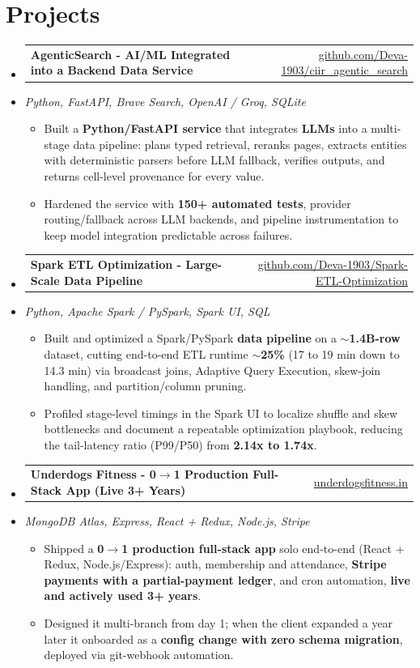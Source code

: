 \documentclass[letterpaper,10pt]{article}
\makeatletter
\newcommand{\resumeItem}[1]{
  \item\small{#1\vspace{-1pt}}
}
\newcommand{\resumeProjectHeading}[2]{
    \item
    \begin{tabular*}{0.985\textwidth}[t]{l@{\extracolsep{\fill}}r}
      \small\textbf{#1} & \small #2 \\
    \end{tabular*}\vspace{-5pt}
}
\newcommand{\resumeProjectSubheading}[1]{
  \vspace{-2pt}\item[] {\small\textcolor{ResumeSlate}{\emph{#1}}}\vspace{-3pt}
}
\newcommand{\resumeSubHeadingListStart}{\begin{itemize}[leftmargin=0.0in, label={}, itemsep=2pt, topsep=2pt]}
\newcommand{\resumeSubHeadingListEnd}{\end{itemize}}
\newcommand{\resumeItemListStart}{\begin{itemize}[leftmargin=0.18in, itemsep=2pt, topsep=1pt]}
\newcommand{\resumeItemListEnd}{\end{itemize}\vspace{-4pt}}
\makeatother
\begin{document}
\section{Projects}
\resumeSubHeadingListStart
  \resumeProjectHeading
    {AgenticSearch - AI/ML Integrated into a Backend Data Service}
    {\href{https://github.com/Deva-1903/ciir_agentic_search}{github.com/Deva-1903/ciir\_agentic\_search}}
  \resumeProjectSubheading{Python, FastAPI, Brave Search, OpenAI / Groq, SQLite}
    \resumeItemListStart
      \resumeItem{Built a \textbf{Python/FastAPI service} that integrates \textbf{LLMs} into a multi-stage data pipeline: plans typed retrieval, reranks pages, extracts entities with deterministic parsers before LLM fallback, verifies outputs, and returns cell-level provenance for every value.}
      \resumeItem{Hardened the service with \textbf{150+ automated tests}, provider routing/fallback across LLM backends, and pipeline instrumentation to keep model integration predictable across failures.}
    \resumeItemListEnd
  \resumeProjectHeading
    {Spark ETL Optimization - Large-Scale Data Pipeline}
    {\href{https://github.com/Deva-1903/Spark-ETL-Optimization}{github.com/Deva-1903/Spark-ETL-Optimization}}
  \resumeProjectSubheading{Python, Apache Spark / PySpark, Spark UI, SQL}
    \resumeItemListStart
      \resumeItem{Built and optimized a Spark/PySpark \textbf{data pipeline} on a \textbf{$\sim$1.4B-row} dataset, cutting end-to-end ETL runtime \textbf{$\sim$25\%} (17 to 19 min down to 14.3 min) via broadcast joins, Adaptive Query Execution, skew-join handling, and partition/column pruning.}
      \resumeItem{Profiled stage-level timings in the Spark UI to localize shuffle and skew bottlenecks and document a repeatable optimization playbook, reducing the tail-latency ratio (P99/P50) from \textbf{2.14x to 1.74x}.}
    \resumeItemListEnd
  \resumeProjectHeading
    {Underdogs Fitness - 0\(\to\)1 Production Full-Stack App (Live 3+ Years)}
    {\href{https://www.underdogsfitness.in/}{underdogsfitness.in}}
  \resumeProjectSubheading{MongoDB Atlas, Express, React + Redux, Node.js, Stripe}
    \resumeItemListStart
      \resumeItem{Shipped a \textbf{0$\to$1 production full-stack app} solo end-to-end (React + Redux, Node.js/Express): auth, membership and attendance, \textbf{Stripe payments with a partial-payment ledger}, and cron automation, \textbf{live and actively used 3+ years}.}
      \resumeItem{Designed it multi-branch from day 1; when the client expanded a year later it onboarded as a \textbf{config change with zero schema migration}, deployed via git-webhook automation.}
    \resumeItemListEnd
\resumeSubHeadingListEnd
\vspace{-4pt}
\end{document}
